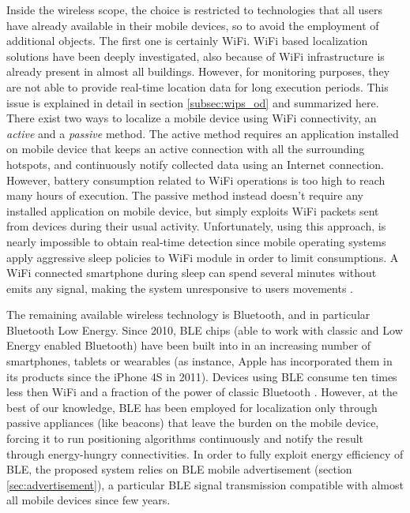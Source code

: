 Inside the wireless scope, the choice is restricted to technologies that all users have already available in their mobile devices, so to avoid the employment of additional objects. The first one is certainly WiFi. WiFi based localization solutions have been deeply investigated, also because of WiFi infrastructure is already present in almost all buildings. However, for monitoring purposes, they are not able to provide real-time location data for long execution periods. This issue is explained in detail in section \ref{subsec:wips_od} and summarized here. There exist two ways to localize a mobile device using WiFi connectivity, an \emph{active} and a \emph{passive} method. The active method requires an application installed on mobile device that keeps an active connection with all the surrounding hotspots, and continuously notify collected data using an Internet connection. However, battery consumption related to WiFi operations is too high to reach many hours of execution. The passive method instead doesn't require any installed application on mobile device, but simply exploits WiFi packets sent from devices during their usual activity. Unfortunately, using this approach, is nearly impossible to obtain real-time detection since mobile operating systems apply aggressive sleep policies to WiFi module in order to limit consumptions. A WiFi connected smartphone during sleep can spend several minutes without emits any signal, making the system unresponsive to users movements \cite{Balaji2013}.

The remaining available wireless technology is Bluetooth, and in particular Bluetooth Low Energy. Since 2010, BLE chips (able to work with classic and Low Energy enabled Bluetooth) have been built into in an increasing number of smartphones, tablets or wearables (as instance, Apple has incorporated them in its products since the iPhone 4S in 2011).
Devices using BLE consume ten times less then WiFi and a fraction of the power of classic Bluetooth \cite{Choperena2013}.
However, at the best of our knowledge, BLE has been employed for localization only through passive appliances (like beacons) that leave the burden on the mobile device, forcing it to run positioning algorithms continuously and notify the result through energy-hungry connectivities.
In order to fully exploit energy efficiency of BLE, the proposed system relies on BLE mobile advertisement (section \ref{sec:advertisement}), a particular BLE signal transmission compatible with almost all mobile devices since few years.


